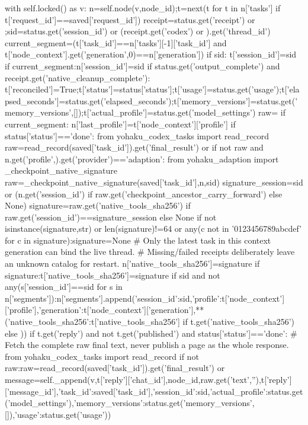   with self.locked() as v:
   n=self.node(v,node_id);t=next(t for t in n['tasks'] if t['request_id']==saved['request_id'])
   receipt=status.get('receipt') or {};sid=status.get('session_id') or (receipt.get('codex') or {}).get('thread_id')
   current_segment=(t['task_id']==n['tasks'][-1]['task_id'] and t['node_context'].get('generation',0)==n['generation'])
   if sid:
    t['session_id']=sid
    if current_segment:n['session_id']=sid
   if status.get('output_complete') and receipt.get('native_cleanup_complete'):
    t['reconciled']=True;t['status']=status['status'];t['usage']=status.get('usage');t['elapsed_seconds']=status.get('elapsed_seconds');t['memory_versions']=status.get('memory_versions',[]);t['actual_profile']=status.get('model_settings')
    raw={}
    if current_segment:
     n['last_profile']=t['node_context']['profile']
     if status['status']=='done':
      from yohaku_codex_tasks import read_record
      raw=read_record(saved['task_id']).get('final_result') or {}
     if not raw and n.get('profile',{}).get('provider')=='adaption':
      from yohaku_adaption import _checkpoint_native_signature
      raw=_checkpoint_native_signature(saved['task_id'],n,sid)
     signature_session=sid or (n.get('session_id') if raw.get('checkpoint_ancestor_carry_forward') else None)
     signature=raw.get('native_tools_sha256') if raw.get('session_id')==signature_session else None
     if not isinstance(signature,str) or len(signature)!=64 or any(c not in '0123456789abcdef' for c in signature):signature=None
     # Only the latest task in this context generation can bind the live thread.
     # Missing/failed receipts deliberately leave an unknown catalog for restart.
     n['native_tools_sha256']=signature
     if signature:t['native_tools_sha256']=signature
    if sid and not any(s['session_id']==sid for s in n['segments']):n['segments'].append({'session_id':sid,'profile':t['node_context']['profile'],'generation':t['node_context']['generation'],**({'native_tools_sha256':t['native_tools_sha256']} if t.get('native_tools_sha256') else {})})
    if t.get('reply') and not t.get('published') and status['status']=='done':
     # Fetch the complete raw final text, never publish a page as the whole response.
     from yohaku_codex_tasks import read_record
     if not raw:raw=read_record(saved['task_id']).get('final_result') or {}
     message=self._append(v,t['reply']['chat_id'],node_id,raw.get('text',''),t['reply']['message_id'],{'task_id':saved['task_id'],'session_id':sid,'actual_profile':status.get('model_settings'),'memory_versions':status.get('memory_versions',[]),'usage':status.get('usage')})
